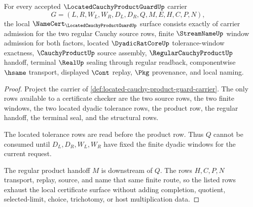 \begin{theorem}
\label{thm:located-cauchy-product-guard-namecert-obligations}
For every accepted $\LocatedCauchyProductGuardUp$ carrier
$$
G=(L,R,W_L,W_R,D_L,D_R,Q,M,E,H,C,P,N),
$$
the local $\NameCert_{\LocatedCauchyProductGuardUp}$ surface consists exactly of carrier admission for the two regular Cauchy source rows, finite $\StreamNameUp$ window admission for both factors, located $\DyadicRatCoreUp$ tolerance-window exactness, $\CauchyProductUp$ source assembly, $\RegularCauchyProductUp$ handoff, terminal $\RealUp$ sealing through regular readback, componentwise $\hsame$ transport, displayed $\Cont$ replay, $\Pkg$ provenance, and local naming.
\end{theorem}
\begin{proof}
Project the carrier of \autoref{def:located-cauchy-product-guard-carrier}. The only rows available to a certificate checker are the two source rows, the two finite windows, the two located dyadic tolerance rows, the product row, the regular handoff, the terminal seal, and the structural rows.

The located tolerance rows are read before the product row. Thus $Q$ cannot be consumed until $D_L,D_R,W_L,W_R$ have fixed the finite dyadic windows for the current request.

The regular product handoff $M$ is downstream of $Q$. The rows $H,C,P,N$ transport, replay, source, and name that same finite route, so the listed rows exhaust the local certificate surface without adding completion, quotient, selected-limit, choice, trichotomy, or host multiplication data.
\end{proof}

